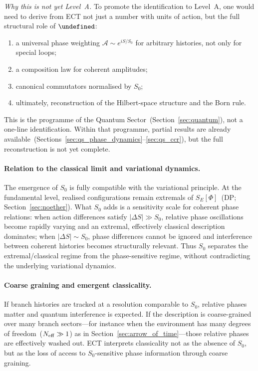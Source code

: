 \documentclass[11pt,a4paper]{article}
\let\hbar\undefined
\numberwithin{equation}{section}
\begin{document}
\emph{Why this is not yet Level~A.}
To promote the identification to Level~A, one would need to
derive from ECT not just a number with units of action, but the
full structural role of $\hbar$:
\begin{enumerate}[label=(\roman*)]
  \item a universal phase weighting $\mathcal{A}\sim e^{iS/S_0}$
    for arbitrary histories, not only for special loops;
  \item a composition law for coherent amplitudes;
  \item canonical commutators normalised by $S_0$;
  \item ultimately, reconstruction of the Hilbert-space structure
    and the Born rule.
\end{enumerate}
This is the programme of the Quantum
Sector~(Section~\ref{sec:quantum}), not a one-line identification.
Within that programme, partial results are already
available~(Sections~\ref{sec:qs_phase_dynamics}--\ref{sec:qs_ccr}),
but the full reconstruction is not yet complete.

\paragraph{Relation to the classical limit and variational dynamics.}
The emergence of $S_0$ is fully compatible with the variational
principle.
At the fundamental level, realised configurations remain extremals
of $S_E[\Phi]$~(DP; Section~\ref{sec:noether}).
What $S_0$ adds is a sensitivity scale for coherent phase relations:
when action differences satisfy $|\Delta S|\gg S_0$, relative phase
oscillations become rapidly varying and an extremal, effectively
classical description dominates; when $|\Delta S|\sim S_0$, phase
differences cannot be ignored and interference between coherent
histories becomes structurally relevant.
Thus $S_0$ separates the extremal/classical regime from the
phase-sensitive regime, without contradicting the underlying
variational dynamics.

\paragraph{Coarse graining and emergent classicality.}
If branch histories are tracked at a resolution comparable to $S_0$,
relative phases matter and quantum interference is expected.
If the description is coarse-grained over many branch sectors---for
instance when the environment has many degrees of
freedom~($N_{\rm eff}\gg1$) as in
Section~\ref{sec:arrow_of_time}---those relative phases are
effectively washed out.
ECT interprets classicality not as the absence of $S_0$, but as the
loss of access to $S_0$-sensitive phase information through coarse
graining.
\end{document}
